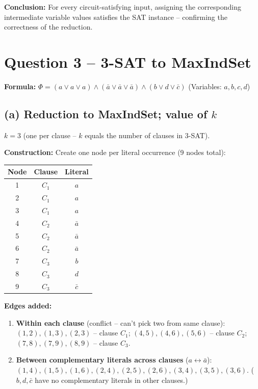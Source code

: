 \documentclass[12pt]{article}
\begin{document}
\textbf{Conclusion:} For every circuit-satisfying input, assigning the
corresponding intermediate variable values satisfies the SAT instance --
confirming the correctness of the reduction.

\section*{Question 3 -- 3-SAT to MaxIndSet}

\textbf{Formula:}
$\Phi = (a\lor a\lor a)\land(\bar{a}\lor\bar{a}\lor\bar{a})\land(b\lor d\lor\bar{c})$
\quad (Variables: $a,b,c,d$)

\subsection*{(a) Reduction to MaxIndSet; value of $k$}

$k = 3$ (one per clause -- $k$ equals the number of clauses in 3-SAT).

\textbf{Construction:} Create one node per literal occurrence (9 nodes total):

\medskip
\begin{center}
\begin{tabular}{|c|c|c|}
\hline
Node & Clause & Literal \\
\hline
1 & $C_1$ & $a$ \\
2 & $C_1$ & $a$ \\
3 & $C_1$ & $a$ \\
4 & $C_2$ & $\bar{a}$ \\
5 & $C_2$ & $\bar{a}$ \\
6 & $C_2$ & $\bar{a}$ \\
7 & $C_3$ & $b$ \\
8 & $C_3$ & $d$ \\
9 & $C_3$ & $\bar{c}$ \\
\hline
\end{tabular}
\end{center}

\textbf{Edges added:}
\begin{enumerate}
  \item \textbf{Within each clause} (conflict -- can't pick two from same clause):
    $(1,2),(1,3),(2,3)$ -- clause $C_1$;
    $(4,5),(4,6),(5,6)$ -- clause $C_2$;
    $(7,8),(7,9),(8,9)$ -- clause $C_3$.
  \item \textbf{Between complementary literals across clauses} ($a\leftrightarrow\bar{a}$):
    $(1,4),(1,5),(1,6),(2,4),(2,5),(2,6),(3,4),(3,5),(3,6)$.
    ($b,d,\bar{c}$ have no complementary literals in other clauses.)
\end{enumerate}
\end{document}
